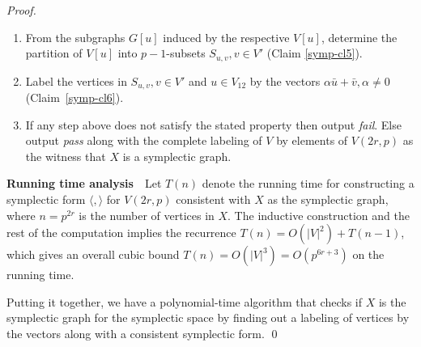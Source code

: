 \documentclass[10pt,a4paper]{amsart}
\newcommand{\sympl}[1]{\langle #1 \rangle}
\begin{document}
\begin{proof}
\begin{enumerate}
\item From the subgraphs $G[u]$ induced by the respective $V[u]$,
  determine the partition of $V[u]$ into $p-1$-subsets $S_{u,v}, v\in
  V'$ (Claim \ref{symp-cl5}).

\item Label the vertices in $S_{u,v}, v\in V'$ and $u\in V_{12}$ by
  the vectors $\alpha\bar{u}+\bar{v}, \alpha\ne 0$
  (Claim~\ref{symp-cl6}).

\item If any step above does not satisfy the stated property then
  output \emph{fail}. Else output \emph{pass} along with the complete
  labeling of $V$ by elements of $V(2r,p)$ as the witness that $X$ is
  a symplectic graph.
\end{enumerate}

\noindent\textbf{Running time analysis}~~Let $T(n)$ denote the
running time for constructing a symplectic form $\sympl{,}$ for
$V(2r,p)$ consistent with $X$ as the symplectic graph, where
$n=p^{2r}$ is the number of vertices in $X$. The inductive
construction and the rest of the computation implies the recurrence
$T(n) = O(|V|^2) +T(n-1)$, which gives an overall cubic bound
$T(n)=O(|V|^3)=O(p^{6r+3})$ on the running time.

Putting it together, we have a polynomial-time algorithm that checks
if $X$ is the symplectic graph for the symplectic space by finding
out a labeling of vertices by the vectors along with a consistent
symplectic form. \qed
\end{proof}
\end{document}
